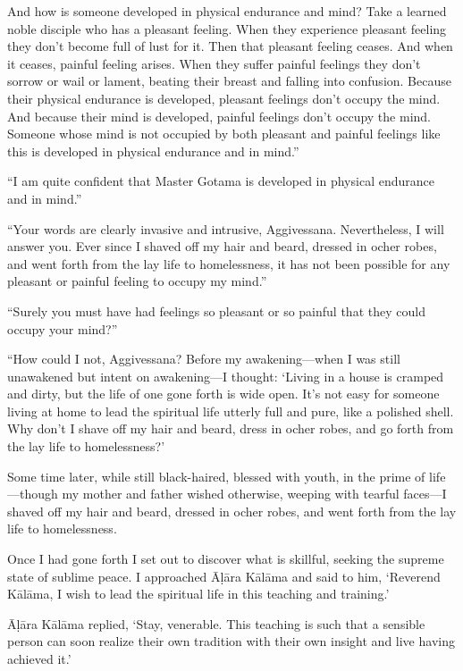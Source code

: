 \documentclass[12pt,openany]{book}%
\begin{document}
And how is someone developed in physical endurance and mind? Take a learned noble disciple who has a pleasant feeling. When they experience pleasant feeling they don’t become full of lust for it. Then that pleasant feeling ceases. And when it ceases, painful feeling arises. When they suffer painful feelings they don’t sorrow or wail or lament, beating their breast and falling into confusion. Because their physical endurance is developed, pleasant feelings don’t occupy the mind. And because their mind is developed, painful feelings don’t occupy the mind. Someone whose mind is not occupied by both pleasant and painful feelings like this is developed in physical endurance and in mind.” 

“I am quite confident that Master Gotama is developed in physical endurance and in mind.” 

“Your words are clearly invasive and intrusive, Aggivessana. Nevertheless, I will answer you. Ever since I shaved off my hair and beard, dressed in ocher robes, and went forth from the lay life to homelessness, it has not been possible for any pleasant or painful feeling to occupy my mind.” 

“Surely you must have had feelings so pleasant or so painful that they could occupy your mind?” 

“How could I not, Aggivessana? Before my awakening—when I was still unawakened but intent on awakening—I thought: ‘Living in a house is cramped and dirty, but the life of one gone forth is wide open. It’s not easy for someone living at home to lead the spiritual life utterly full and pure, like a polished shell. Why don’t I shave off my hair and beard, dress in ocher robes, and go forth from the lay life to homelessness?’ 

Some time later, while still black-haired, blessed with youth, in the prime of life—though my mother and father wished otherwise, weeping with tearful faces—I shaved off my hair and beard, dressed in ocher robes, and went forth from the lay life to homelessness. 

Once I had gone forth I set out to discover what is skillful, seeking the supreme state of sublime peace. I approached \textsanskrit{Āḷāra} \textsanskrit{Kālāma} and said to him, ‘Reverend \textsanskrit{Kālāma}, I wish to lead the spiritual life in this teaching and training.’ 

\textsanskrit{Āḷāra} \textsanskrit{Kālāma} replied, ‘Stay, venerable. This teaching is such that a sensible person can soon realize their own tradition with their own insight and live having achieved it.’ 
\end{document}
